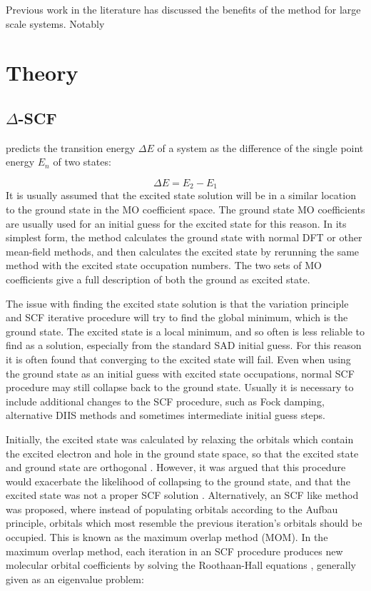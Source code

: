 Previous work in the literature has discussed the benefits of the \dscf method for 
large scale systems. Notably 

\section{Theory}
\label{sec:dscf_theory}
\subsection{$\Delta$-SCF}
\label{subsec{dscf_and_eigdiff}}

\dscf predicts the transition energy $\Delta E$ of a system as the difference of
the single point energy $E_n$ of two states:

\begin{equation}
\Delta E = E_{2} - E_{1}
\end{equation}
%
It is usually assumed that the excited state solution will be in a similar
location to the ground state in the MO coefficient space. The ground state MO 
coefficients are usually used for an initial guess for the excited
state for this reason. In its simplest form, the \dscf method calculates
the ground state with normal DFT or other mean-field methods, and
then calculates the excited state by rerunning the same method with the excited
state occupation numbers. The two sets of MO coefficients give a full description
of both the ground as excited state.

The issue with finding the excited state solution is that the variation principle
and SCF iterative procedure will try to find the global minimum, which is the 
ground state. The excited state is a local minimum, and so often is less reliable
to find as a solution, especially from the standard SAD initial guess.
For this reason it is often found that converging to the \dscf excited state will
fail. Even when using the ground state as an initial guess with excited state
occupations, normal SCF procedure may still collapse back to the ground state.
Usually it is necessary to include additional changes to the SCF procedure,
such as Fock damping, alternative DIIS methods and sometimes intermediate 
initial guess steps.

Initially, the excited state was calculated by relaxing the orbitals which
contain the excited electron and hole in the ground state space, so that the
excited state and ground state are orthogonal \cite{Hunt1969}. However, it was
argued that this procedure would exacerbate the likelihood of collapsing to the ground
state, and that the excited state was not a proper SCF solution \cite{Gilbert2008}.
Alternatively, an SCF like method was proposed, where instead of
populating orbitals according to the Aufbau principle, orbitals which most
resemble the previous iteration's orbitals should be occupied. This is known as 
the maximum overlap method (MOM). In the maximum overlap method, each iteration 
in an SCF procedure produces new molecular orbital coefficients by solving the 
Roothaan-Hall equations \cite{Roothaan1951}, generally given as an eigenvalue problem:

